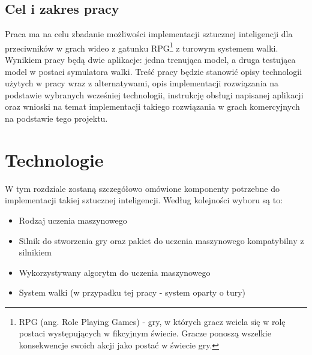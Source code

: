 \documentclass{SGGW-thesis}
\begin{document}
\section{Cel i zakres pracy}
Praca ma na celu zbadanie możliwości implementacji sztucznej inteligencji dla przeciwników w grach wideo z gatunku RPG\footnote{RPG (ang. Role Playing Games)
- gry, w których gracz wciela się w rolę postaci występujących w fikcyjnym świecie. Gracze ponoszą wszelkie konsekwencje swoich akcji jako postać w świecie gry.}
z turowym systemem walki. Wynikiem pracy będą dwie aplikacje: jedna trenująca model, a druga testująca model w postaci symulatora walki. 
Treść pracy będzie stanowić opisy technologii użytych w pracy wraz z alternatywami, opis implementacji rozwiązania na podstawie wybranych 
wcześniej technologii, instrukcję obsługi napisanej aplikacji oraz wnioski na temat implementacji takiego rozwiązania w grach komercyjnych na 
podstawie tego projektu.

\chapter{Technologie}
W tym rozdziale zostaną szczegółowo omówione komponenty potrzebne do implementacji takiej sztucznej inteligencji. Według kolejności wyboru są to: 
\begin{itemize}
  \item{Rodzaj uczenia maszynowego}
  \item{Silnik do stworzenia gry oraz pakiet do uczenia maszynowego kompatybilny z silnikiem}
  \item{Wykorzystywany algorytm do uczenia maszynowego}
  \item{System walki (w przypadku tej pracy - system oparty o tury)}
\end{itemize}
\end{document}
